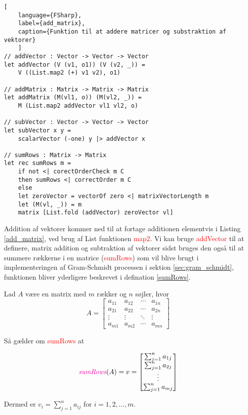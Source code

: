 \begin{lstlisting}[
    language={FSharp}, 
    label={add_matrix}, 
    caption={Funktion til at addere matricer og substraktion af vektorer}
    ]
// addVector : Vector -> Vector -> Vector
let addVector (V (v1, o1)) (V (v2, _)) =
    V ((List.map2 (+) v1 v2), o1)

// addMatrix : Matrix -> Matrix -> Matrix
let addMatrix (M(vl1, o)) (M(vl2, _)) =
    M (List.map2 addVector vl1 vl2, o)

// subVector : Vector -> Vector -> Vector
let subVector x y =
    scalarVector (-one) y |> addVector x
    
// sumRows : Matrix -> Matrix
let rec sumRows m = 
    if not <| corectOrderCheck m C 
    then sumRows <| correctOrder m C
    else
    let zeroVector = vectorOf zero <| matrixVectorLength m
    let (M(vl, _)) = m
    matrix [List.fold (addVector) zeroVector vl]
\end{lstlisting}

Addition af vektorer kommer ned til at fortage additionen elementvis i Listing \ref{add_matrix}, ved brug af List funktionen \textcolor{red}{map2}. Vi kan bruge \textcolor{red}{addVector} til at definere, matrix addition og subtraktion af vektorer sidst bruges den også til at summere rækkerne i en matrice (\textcolor{red}{sumRows}) som vil blive brugt i implementeringen af Gram-Schmidt processen i sektion \ref{sec:gram_schmidt}, funktionen bliver yderligere beskrevet i defination \ref{sumRows}.
\vspace{0.5cm}
\begin{definition} \label{sumRows}
Lad $A$ være en matrix med $m$ rækker og $n$ søjler, hvor
\[
A = \begin{bmatrix}
a_{11} & a_{12} & \cdots & a_{1n} \\
a_{21} & a_{22} & \cdots & a_{2n} \\
\vdots & \vdots & \ddots & \vdots \\
a_{m1} & a_{m2} & \cdots & a_{mn}
\end{bmatrix}
\]

Så gælder om \textcolor{red}{sumRows} at

\[
\textit{\textcolor{red}{sumRows}}(A) =
v = \begin{bmatrix}
\sum_{j=1}^{n} a_{1j} \\
\sum_{j=1}^{n} a_{2j} \\
\vdots \\
\sum_{j=1}^{n} a_{mj}
\end{bmatrix}
\]

Dermed er $v_i = \sum_{j=1}^{n} a_{ij}$ for $i = 1, 2, \ldots, m$.
\end{definition}

